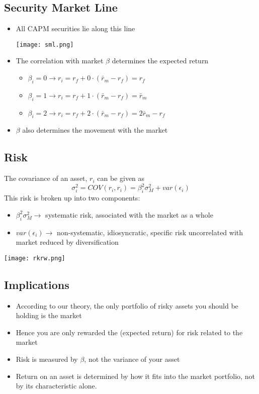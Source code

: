 \documentclass[11pt]{article}
\begin{document}
\subsection{Security Market Line}
\begin{itemize}
\item All CAPM securities lie along this line 
\begin{center}
\texttt{[image: sml.png]} 
\end{center}
\item The correlation with market $\beta$ determines the expected return
\begin{itemize}
\item $\beta_i = 0 \rightarrow r_i = r_f + 0 \cdot (\bar{r}_m - r_f) = r_f $
\item $\beta_i = 1 \rightarrow r_i = r_f + 1 \cdot (\bar{r}_m - r_f) = \bar{r}_m $
\item $\beta_i = 2 \rightarrow r_i = r_f + 2 \cdot (\bar{r}_m - r_f) = 2\bar{r}_m -r_f $
\end{itemize}
\item $\beta$ also determines the movement with the market
\end{itemize}

\subsection{Risk}
The covariance of an asset, $r_i$ can be given as 
$$ \sigma_i^2 = COV(r_i, r_i) = \beta_i^2\sigma^2_M + var(\epsilon_i)$$
This risk is broken up into two components:
\begin{itemize}
\item $\beta_i^2\sigma^2_M \rightarrow $ systematic risk, associated with the market as a whole
\item $ var(\epsilon_i) \rightarrow $ non-systematic,  idiosyncratic, specific risk uncorrelated with market reduced by diversification
\end{itemize}
\begin{center}
\texttt{[image: rkrw.png]} 
\end{center}

\subsection{Implications}
\begin{itemize}
\item According to our theory, the only portfolio of risky assets you should be holding is the market
\item Hence you are only rewarded the (expected return) for risk related to the market 
\item Risk is measured by $\beta$, not the variance of your asset
\item Return on an asset is determined by how it fits into the market portfolio, not by its characteristic alone.
\end{itemize}
\end{document}

